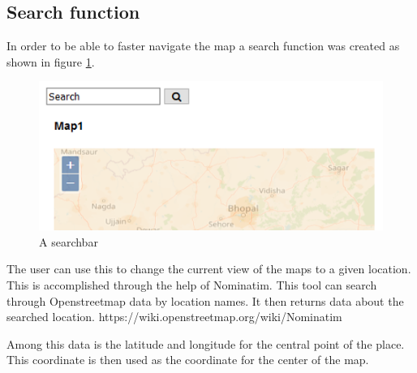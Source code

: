 
\subsection{Search function}
In order to be able to faster navigate the map a search function was created as shown in figure \ref{SearchBar}. 
 
 \begin{figure} [H]
 	\centering
 	\includegraphics[width=.8\textwidth]{Pictures/SearchBar}
 	\caption{A searchbar}
 	\label{SearchBar}
 \end{figure}
 
The user can use this to change the current view of the maps to a given location. This is accomplished through the help of Nominatim. This tool can search through Openstreetmap data by location names. It then returns data about the searched location. 
https://wiki.openstreetmap.org/wiki/Nominatim

Among this data is the latitude and longitude for the central point of the place.    
This coordinate is then used as the coordinate for the center of the map.

